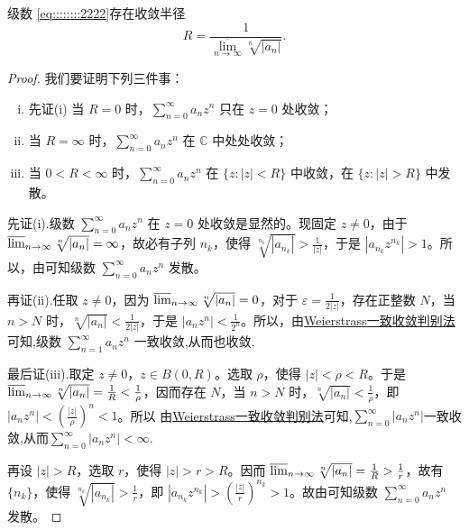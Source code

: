 \documentclass[../../main.tex]{subfiles}
\begin{document}
\begin{theorem}\label{theorem:定理4.2.2}
级数 \eqref{eq::::::::2222}存在收敛半径
\[
R=\frac{1}{\underset{n\rightarrow \infty}{\overline{\lim }}\sqrt[n]{|a_n|}}.
\]
\end{theorem}
\begin{proof}
我们要证明下列三件事：
\begin{enumerate}[(i)]
\item 先证(i) 当 \( R = 0 \) 时，\( \sum_{n=0}^{\infty} a_n z^n \) 只在 \( z = 0 \) 处收敛；

\item 当 \( R = \infty \) 时，\( \sum_{n=0}^{\infty} a_n z^n \) 在 \( \mathbb{C} \) 中处处收敛；

\item 当 \( 0 < R < \infty \) 时，\( \sum_{n=0}^{\infty} a_n z^n \) 在 \( \{z : |z| < R\} \) 中收敛，在 \( \{z : |z| > R\} \) 中发散。
\end{enumerate}
先证(i).级数 \( \sum_{n=0}^{\infty} a_n z^n \) 在 \( z = 0 \) 处收敛是显然的。现固定 \( z \neq 0 \)，由于 \( \varlimsup_{n \to \infty} \sqrt[n]{|a_n|} = \infty \)，故必有子列 \( n_k \)，使得 \( \sqrt[n_k]{|a_{n_k}|} > \frac{1}{|z|} \)，于是 \( |a_{n_k} z^{n_k}| > 1 \)。所以，由可知级数 \( \sum_{n=0}^{\infty} a_n z^n \) 发散。

再证(ii).任取 \( z \neq 0 \)，因为 \( \varlimsup_{n \to \infty} \sqrt[n]{|a_n|} = 0 \)，对于 \( \varepsilon = \frac{1}{2|z|} \)，存在正整数 \( N \)，当 \( n > N \) 时，\( \sqrt[n]{|a_n|} < \frac{1}{2|z|} \)，于是 \( |a_n z^n| < \frac{1}{2^n} \)。所以，由\hyperref[theorem:Weierstrass一致收敛判别法]{Weierstrass一致收敛判别法}可知,级数 \( \sum_{n=1}^{\infty} a_n z^n \) 一致收敛,从而也收敛.

最后证(iii).取定 \( z \neq 0 \)，\( z \in B(0, R) \)。选取 \( \rho \)，使得 \( |z| < \rho < R \)。于是 \( \varlimsup_{n \to \infty} \sqrt[n]{|a_n|} = \frac{1}{R} < \frac{1}{\rho} \)，因而存在 \( N \)，当 \( n > N \) 时，\( \sqrt[n]{|a_n|} < \frac{1}{\rho} \)，即 \( |a_n z^n| < \left( \frac{|z|}{\rho} \right)^n<1 \)。所以 由\hyperref[theorem:Weierstrass一致收敛判别法]{Weierstrass一致收敛判别法}可知,\( \sum_{n=0}^{\infty} |a_n z^n|\)一致收敛,从而\( \sum_{n=0}^{\infty} |a_n z^n| < \infty \).

再设 \( |z| > R \)，选取 \( r \)，使得 \( |z| > r > R \)。因而 \( \varlimsup_{n \to \infty} \sqrt[n]{|a_n|} = \frac{1}{R} > \frac{1}{r} \)，故有 \( \{n_k\} \)，使得 \( \sqrt[n_k]{|a_{n_k}|} > \frac{1}{r} \)，即 \( |a_{n_k} z^{n_k}| > \left( \frac{|z|}{r} \right)^{n_k} > 1 \)。故由可知级数 \( \sum_{n=0}^{\infty} a_n z^n \) 发散。

\end{proof}
\end{document}
